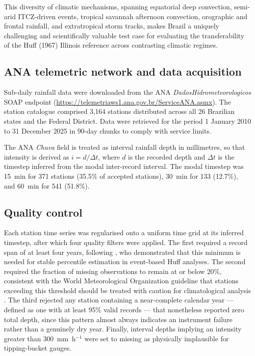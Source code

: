 \documentclass[a4paper,fleqn]{cas-sc}
\begin{document}
This diversity of climatic mechanisms, spanning equatorial deep
convection, semi-arid ITCZ-driven events, tropical savannah
afternoon convection, orographic and frontal rainfall, and
extratropical storm tracks, makes Brazil a uniquely challenging
and scientifically valuable test case for evaluating the
transferability of the Huff (1967) Illinois reference across
contrasting climatic regimes.

\subsection{ANA telemetric network and data acquisition}

Sub-daily rainfall data were downloaded from the ANA
\textit{DadosHidrometeorologicos} SOAP endpoint
(\url{https://telemetriaws1.ana.gov.br/ServiceANA.asmx}). The station
catalogue comprised 3,164 stations distributed across all 26 Brazilian
states and the Federal District. Data were retrieved for the period
1 January 2010 to 31 December 2025 in 90-day chunks to comply with
service limits.

The ANA \textit{Chuva} field is treated as interval rainfall depth
in millimetres, so that intensity is derived as $i = d / \Delta t$,
where $d$ is the recorded depth and $\Delta t$ is the timestep
inferred from the modal inter-record interval. The modal timestep was
15~min for 371 stations (35.5\% of accepted stations), 30~min for 133
(12.7\%), and 60~min for 541 (51.8\%).

\subsection{Quality control}

Each station time series was regularised onto a uniform time grid at
its inferred timestep, after which four quality filters were applied.
The first required a record span of at least four years, following
\citet{BontaRao1988}, who demonstrated that this minimum is needed for
stable percentile estimation in event-based Huff analyses. The second
required the fraction of missing observations to remain at or below
20\%, consistent with the World Meteorological Organization guideline
that stations exceeding this threshold should be treated with caution
for climatological analysis \citep{WMO2018}. The third rejected any
station containing a near-complete calendar year — defined as one with
at least 95\% valid records — that nonetheless reported zero total
depth, since this pattern almost always indicates an instrument
failure rather than a genuinely dry year. Finally, interval depths
implying an intensity greater than 300~mm~h$^{-1}$ were set to missing
as physically implausible for tipping-bucket gauges.
\end{document}
